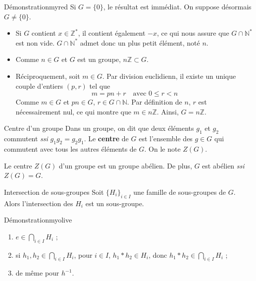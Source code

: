     \begin{demo}{Démonstration}{myred}
        Si $G = \{0\}$, le résultat est immédiat. On suppose désormais $G \neq \{0\}$.
        \begin{itemize}
            \item Si $G$ contient $x \in \mathbb{Z}^*$, il contient également $-x$, ce qui nous assure que $G \cap \mathbb{N}^*$ est non vide. $G \cap \mathbb{N}^*$ admet donc un plus petit élément, noté $n$.
            \item Comme $n \in G$ et $G$ est un groupe, $n \mathbb{Z} \subset G$.
            \item Réciproquement, soit $m \in G$. Par division euclidienn, il existe un unique couple d’entiers $(p,r)$ tel que 
            \[ m = pn + r \quad \text{avec } 0 \leq r < n \]  
            Comme $m \in G$ et $pn \in G$, $r \in G \cap \mathbb{N}$. Par définition de $n$, $r$ est nécessairement nul, ce qui montre que $m \in n \mathbb{Z}$. Ainsi, $G = n \mathbb{Z}$.
        \end{itemize}
    \end{demo}

    \begin{defi}{Centre d’un groupe}{}
        Dans un groupe, on dit que deux éléments $g_1$ et $g_2$ commutent \textit{ssi} $g_1 g_2 = g_2 g_1$. Le \textbf{centre} de $G$ est l’ensemble des $g \in G$ qui commutent avec tous les autres éléments de $G$. On le note $Z(G)$.
    \end{defi}

    \begin{prop}{}{}
        Le centre $Z(G)$ d’un groupe est un groupe abélien. De plus, $G$ est abélien \textit{ssi} $Z(G) = G$.
    \end{prop}

    \begin{prop}{Intersection de sous-groupes}{}
        Soit $\big\{ H_i \big\}_{i \in I}$ une famille de sous-groupes de $G$. Alors l’intersection des $H_i$ est un sous-groupe.
    \end{prop}

    \begin{demo}{Démonstration}{myolive}
        \begin{enumerate}[label = \arabic*.]
            \item $e \in \bigcap_{i \in I} H_i$ ;
            \item si $h_1, h_2 \in \bigcap_{i \in I} H_i$, pour $i \in I$, $h_1 * h_2 \in H_i$, donc $h_1 * h_2 \in \bigcap_{i \in I} H_i$ ;
            \item de même pour $h^{-1}$.
        \end{enumerate}
    \end{demo}

